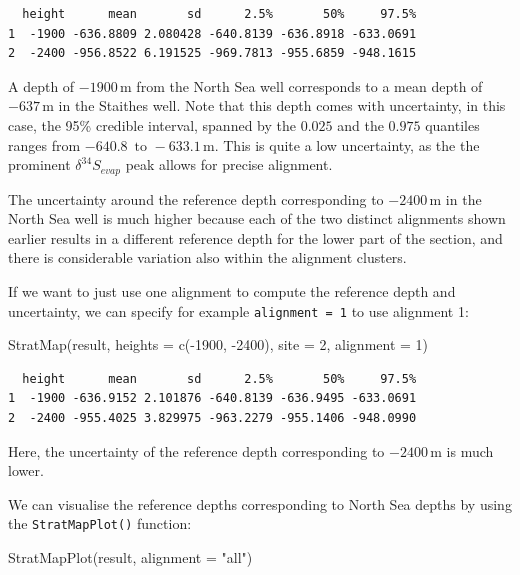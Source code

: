 \documentclass[
  letterpaper,
  DIV=11,
  numbers=noendperiod]{scrartcl}
\newenvironment{Shaded}{\begin{snugshade}}{\end{snugshade}}
\newcommand{\AttributeTok}[1]{\textcolor[rgb]{0.40,0.45,0.13}{#1}}
\newcommand{\DecValTok}[1]{\textcolor[rgb]{0.68,0.00,0.00}{#1}}
\newcommand{\FunctionTok}[1]{\textcolor[rgb]{0.28,0.35,0.67}{#1}}
\newcommand{\NormalTok}[1]{\textcolor[rgb]{0.00,0.23,0.31}{#1}}
\newcommand{\SpecialCharTok}[1]{\textcolor[rgb]{0.37,0.37,0.37}{#1}}
\newcommand{\StringTok}[1]{\textcolor[rgb]{0.13,0.47,0.30}{#1}}
\begin{document}
\begin{verbatim}
  height      mean       sd      2.5%       50%     97.5%
1  -1900 -636.8809 2.080428 -640.8139 -636.8918 -633.0691
2  -2400 -956.8522 6.191525 -969.7813 -955.6859 -948.1615
\end{verbatim}

A depth of \(-1900 \, \text{m}\) from the North Sea well corresponds to
a mean depth of \(-637 \, \text{m}\) in the Staithes well. Note that
this depth comes with uncertainty, in this case, the 95\% credible
interval, spanned by the \(0.025\) and the \(0.975\) quantiles ranges
from \(-640.8 \, \text{ to } -633.1 \, \text{m}\). This is quite a low
uncertainty, as the the prominent \(\delta^{34}S_{evap}\) peak allows
for precise alignment.

The uncertainty around the reference depth corresponding to
\(-2400 \, \text{m}\) in the North Sea well is much higher because each
of the two distinct alignments shown earlier results in a different
reference depth for the lower part of the section, and there is
considerable variation also within the alignment clusters.

If we want to just use one alignment to compute the reference depth and
uncertainty, we can specify for example \texttt{alignment\ =\ 1} to use
alignment 1:

\begin{Shaded}
\begin{Highlighting}[]
\FunctionTok{StratMap}\NormalTok{(result, }\AttributeTok{heights =} \FunctionTok{c}\NormalTok{(}\SpecialCharTok{{-}}\DecValTok{1900}\NormalTok{, }\SpecialCharTok{{-}}\DecValTok{2400}\NormalTok{), }\AttributeTok{site =} \DecValTok{2}\NormalTok{, }\AttributeTok{alignment =} \DecValTok{1}\NormalTok{)}
\end{Highlighting}
\end{Shaded}

\begin{verbatim}
  height      mean       sd      2.5%       50%     97.5%
1  -1900 -636.9152 2.101876 -640.8139 -636.9495 -633.0691
2  -2400 -955.4025 3.829975 -963.2279 -955.1406 -948.0990
\end{verbatim}

Here, the uncertainty of the reference depth corresponding to
\(-2400 \, \text{m}\) is much lower.

We can visualise the reference depths corresponding to North Sea depths
by using the \texttt{StratMapPlot()} function:

\begin{Shaded}
\begin{Highlighting}[]
\FunctionTok{StratMapPlot}\NormalTok{(result, }\AttributeTok{alignment =} \StringTok{"all"}\NormalTok{)}
\end{Highlighting}
\end{Shaded}
\end{document}
